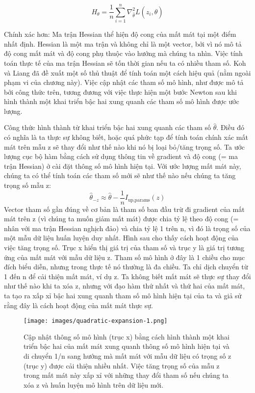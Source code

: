 $$H_{\theta}=\frac{1}{n}\sum_{i=1}^n\nabla^2_{\hat{\theta}}L(z_i,\hat{\theta})$$

Chính xác hơn: Ma trận Hessian thể hiện độ cong của mất mát tại một điểm nhất định. Hessian là một ma trận và không chỉ là một vector, bởi vì nó mô tả độ cong mất mát và độ cong phụ thuộc vào hướng mà chúng ta nhìn. Việc tính toán thực tế của ma trận Hessian sẽ tốn thời gian nếu ta có nhiều tham số. Koh và Liang đã đề xuất một số thủ thuật để tính toán một cách hiệu quả (nằm ngoài phạm vi của chương này). Việc cập nhật các tham số mô hình, như được mô tả bởi công thức trên, tương đương với việc thực hiện một bước Newton sau khi hình thành một khai triển bậc hai xung quanh các tham số mô hình được ước lượng.

Công thức hình thành từ khai triển bậc hai xung quanh các tham số \begin{math} \hat{\theta} \end{math}. Điều đó có nghĩa là ta thực sự không biết, hoặc quá phức tạp để tính toán chính xác mất mát trên mẫu z sẽ thay đổi như thế nào khi nó bị loại bỏ/tăng trọng số. Ta ước lượng cục bộ hàm bằng cách sử dụng thông tin về gradient và độ cong (= ma trận Hessian) ở cài đặt thông số mô hình hiện tại. Với ước lượng mất mát này, chúng ta có thể tính toán các tham số mới sẽ như thế nào nếu chúng ta tăng trọng số mẫu z:
$$\hat{\theta}_{-z}\approx\hat{\theta}-\frac{1}{n}I_{\text{up,params}}(z)$$
Vector tham số gần đúng về cơ bản là tham số ban đầu trừ đi gradient của mất mát trên z (vì chúng ta muốn giảm mất mát) được chia tỷ lệ theo độ cong (= nhân với ma trận Hessian nghịch đảo) và chia tỷ lệ 1 trên n, vì đó là trọng số của một mẫu dữ liệu huấn luyện duy nhất. Hình sau cho thấy cách hoạt động của việc tăng trọng số. Trục x hiển thị giá trị của tham số và trục y là giá trị tương ứng của mất mát với mẫu dữ liệu z. Tham số mô hình ở đây là 1 chiều cho mục đích biểu diễn, nhưng trong thực tế nó thường là đa chiều. Ta chỉ dịch chuyển từ 1 đến n để cải thiện mất mát, ví dụ z. Ta không biết mất mát sẽ thực sự thay đổi như thế nào khi ta xóa z, nhưng với đạo hàm thứ nhất và thứ hai của mất mát, ta tạo ra xấp xỉ bậc hai xung quanh tham số mô hình hiện tại của ta và giả sử rằng đây là cách hoạt động của mất mát thực sự.

\begin{figure}[h!]
    \centering
    \texttt{[image: images/quadratic-expansion-1.png]}
    \caption{Cập nhật thông số mô hình (trục x) bằng cách hình thành một khai triển bậc hai của mất mát xung quanh thông số mô hình hiện tại và di chuyển 1/n sang hướng mà mất mát với mẫu dữ liệu có trọng số z (trục y) được cải thiện nhiều nhất. Việc tăng trọng số của mẫu z trong mất mát này xấp xỉ với những thay đổi tham số nếu chúng ta xóa z và huấn luyện mô hình trên dữ liệu mới.}
    \label{fig:6_16}
\end{figure}

